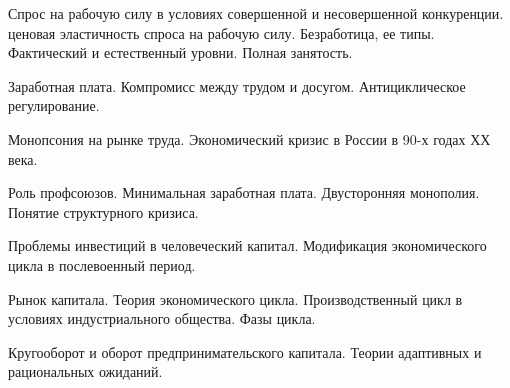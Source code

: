 \documentclass[
	14pt,
	a4paper,
	]
	{scrartcl}
\begin{document}
\vfill
\z 	Спрос на рабочую силу в условиях совершенной и несовершенной конкуренции. ценовая эластичность спроса на рабочую силу.
 \vfill
\z 	Безработица, ее типы. Фактический и естественный уровни. Полная занятость.
 \vfill

\vfill

\newpage


\shapk
{}
\setcounter{zad}{0}

\vfill
\z 	Заработная плата. Компромисс между трудом и досугом.
 \vfill
\z 	Антициклическое регулирование.
 \vfill

\vfill

\newpage


\shapk
{}
\setcounter{zad}{0}

\vfill
\z 	Монопсония на рынке труда.
 \vfill
\z 	Экономический кризис в России в 90-х годах ХХ века.
 \vfill

\vfill

\newpage


\shapk
{}
\setcounter{zad}{0}

\vfill
\z 	Роль профсоюзов. Минимальная заработная плата.  Двусторонняя монополия.
 \vfill
\z 	Понятие структурного кризиса.
 \vfill

\vfill

\newpage


\shapk
{}
\setcounter{zad}{0}

\vfill
\z 	Проблемы инвестиций в человеческий капитал.
 \vfill
\z 	Модификация экономического цикла в послевоенный период.
 \vfill

\vfill

\newpage


\shapk
{}
\setcounter{zad}{0}

\vfill
\z 	 Рынок капитала.
 \vfill
\z 	Теория экономического цикла. Производственный цикл в условиях индустриального общества. Фазы цикла.
 \vfill

\vfill

\newpage


\shapk
{}
\setcounter{zad}{0}

\vfill
\z 	Кругооборот и оборот предпринимательского капитала.
 \vfill
\z 	Теории адаптивных и рациональных ожиданий. 
 \vfill

\vfill

\newpage


\shapk
{}
\setcounter{zad}{0}
\end{document}
